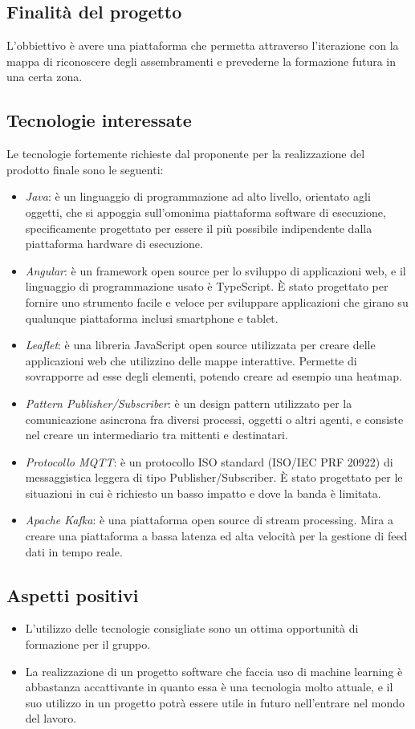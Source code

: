 \subsection{Finalità del progetto}
L'obbiettivo è avere una piattaforma che permetta attraverso l'iterazione con la mappa di riconoscere degli assembramenti e prevederne la formazione futura in una certa zona.

\subsection{Tecnologie interessate}
Le tecnologie fortemente richieste dal proponente per la realizzazione del prodotto finale sono le seguenti:
\begin{itemize}
    \item \textit{Java}: è un linguaggio di programmazione ad alto livello, orientato agli oggetti, che si appoggia sull'omonima piattaforma software di esecuzione, specificamente progettato per essere il più possibile indipendente dalla piattaforma hardware di esecuzione.
    \item \textit{Angular}: è un framework open source per lo sviluppo di applicazioni web, e il linguaggio di programmazione usato è TypeScript. È stato progettato per fornire uno strumento facile e veloce per sviluppare applicazioni che girano su qualunque piattaforma inclusi smartphone e tablet.
    \item \textit{Leaflet}: è una libreria JavaScript open source utilizzata per creare delle applicazioni web che utilizzino delle mappe interattive. Permette di sovrapporre ad esse degli elementi, potendo creare ad esempio una heatmap.
    \item \textit{Pattern Publisher/Subscriber}: è un design pattern utilizzato per la comunicazione asincrona fra diversi processi, oggetti o altri agenti, e consiste nel creare un intermediario tra mittenti e destinatari.
    \item \textit{Protocollo MQTT}: è un protocollo ISO standard (ISO/IEC PRF 20922) di messaggistica leggera di tipo Publisher/Subscriber. È stato progettato per le situazioni in cui è richiesto un basso impatto e dove la banda è limitata.
    \item \textit{Apache Kafka}: è una piattaforma open source di stream processing. Mira a creare una piattaforma a bassa latenza ed alta velocità per la gestione di feed dati in tempo reale.
\end{itemize}

\subsection{Aspetti positivi}
\begin{itemize}
    \item L’utilizzo delle tecnologie consigliate sono un ottima opportunità di formazione per il gruppo.
    \item La realizzazione di un progetto software che faccia uso di machine learning è abbastanza accattivante in quanto essa è una tecnologia molto attuale, e il suo utilizzo in un progetto potrà essere utile in futuro nell’entrare nel mondo del lavoro.
\end{itemize}

